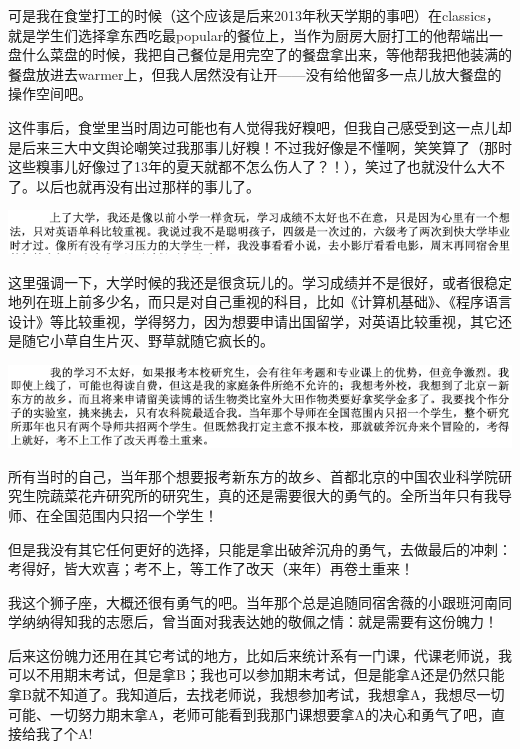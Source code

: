 \documentclass[9pt, b5paper]{article}
\begin{document}
可是我在食堂打工的时候（这个应该是后来2013年秋天学期的事吧）在classics，就是学生们选择拿东西吃最popular的餐位上，当作为厨房大厨打工的他帮端出一盘什么菜盘的时候，我把自己餐位是用完空了的餐盘拿出来，等他帮我把他装满的餐盘放进去warmer上，但我人居然没有让开——没有给他留多一点儿放大餐盘的操作空间吧。

这件事后，食堂里当时周边可能也有人觉得我好糗吧，但我自己感受到这一点儿却是后来三大中文舆论嘲笑过我那事儿好糗！不过我好像是不懂啊，笑笑算了（那时这些糗事儿好像过了13年的夏天就都不怎么伤人了？！），笑过了也就没什么大不了。以后也就再没有出过那样的事儿了。 

\begin{center}
\includegraphics[width=.9\linewidth]{./pic/backups_plans_20210503_101947.png}
\end{center}

这里强调一下，大学时候的我还是很贪玩儿的。学习成绩并不是很好，或者很稳定地列在班上前多少名，而只是对自己重视的科目，比如《计算机基础》、《程序语言设计》等比较重视，学得努力，因为想要申请出国留学，对英语比较重视，其它还是随它小草自生片灭、野草就随它疯长的。 

\begin{center}
\includegraphics[width=.9\linewidth]{./pic/backups_plans_20210422_095355.png}
\end{center}

所有当时的自己，当年那个想要报考新东方的故乡、首都北京的中国农业科学院研究生院蔬菜花卉研究所的研究生，真的还是需要很大的勇气的。全所当年只有我导师、在全国范围内只招一个学生！

但是我没有其它任何更好的选择，只能是拿出破斧沉舟的勇气，去做最后的冲刺：考得好，皆大欢喜；考不上，等工作了改天（来年）再卷土重来！

我这个狮子座，大概还很有勇气的吧。当年那个总是追随同宿舍薇的小跟班河南同学纳纳得知我的志愿后，曾当面对我表达她的敬佩之情：就是需要有这份魄力！

后来这份魄力还用在其它考试的地方，比如后来统计系有一门课，代课老师说，我可以不用期末考试，但是拿B；我也可以参加期末考试，但是能拿A还是仍然只能拿B就不知道了。我知道后，去找老师说，我想参加考试，我想拿A，我想尽一切可能、一切努力期末拿A，老师可能看到我那门课想要拿A的决心和勇气了吧，直接给我了个A! 
\end{document}

